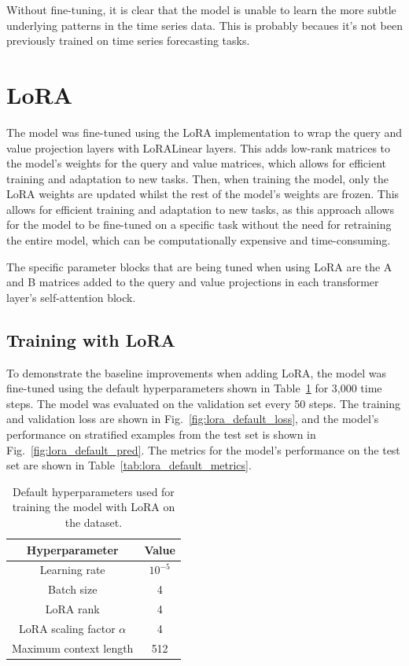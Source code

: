 \documentclass[11pt,a4paper]{article}
\begin{document}
Without fine-tuning, it is clear that the model is unable to learn the more subtle underlying patterns in the time series data. This is probably becaues it's not been previously trained on time series forecasting tasks.
\clearpage
\section{LoRA}
\label{sec:lora}

The model was fine-tuned using the LoRA \citep{hu2021loralowrankadaptationlarge} implementation to wrap the query and value projection layers with LoRALinear layers. This adds low-rank matrices to the model's weights for the query and value matrices, which allows for efficient training and adaptation to new tasks. Then, when training the model, only the LoRA weights are updated whilst the rest of the model's weights are frozen. This allows for efficient training and adaptation to new tasks, as this approach allows for the model to be fine-tuned on a specific task without the need for retraining the entire model, which can be computationally expensive and time-consuming.

The specific parameter blocks that are being tuned when using LoRA are the A and B matrices added to the query and value projections in each transformer layer's self-attention block.

\subsection{Training with LoRA}
To demonstrate the baseline improvements when adding LoRA, the model was fine-tuned using the default hyperparameters shown in Table~\ref{tab:lora_default} for 3,000 time steps. The model was evaluated on the validation set every 50 steps. The training and validation loss are shown in Fig.~\ref{fig:lora_default_loss}, and the model's performance on stratified examples from the test set is shown in Fig.~\ref{fig:lora_default_pred}. The metrics for the model's performance on the test set are shown in Table~\ref{tab:lora_default_metrics}.

\begin{table}[h]
    \centering
    \begin{tabular}{c|c}
        Hyperparameter & Value \\
        \hline
        Learning rate & $10^{-5}$ \\
        Batch size & 4 \\
        LoRA rank & 4 \\
        LoRA scaling factor $\alpha$ & 4 \\
        Maximum context length & 512 \\
    \end{tabular}
    \caption{Default hyperparameters used for training the model with LoRA on the dataset.}
    \label{tab:lora_default}
\end{table}
\end{document}
